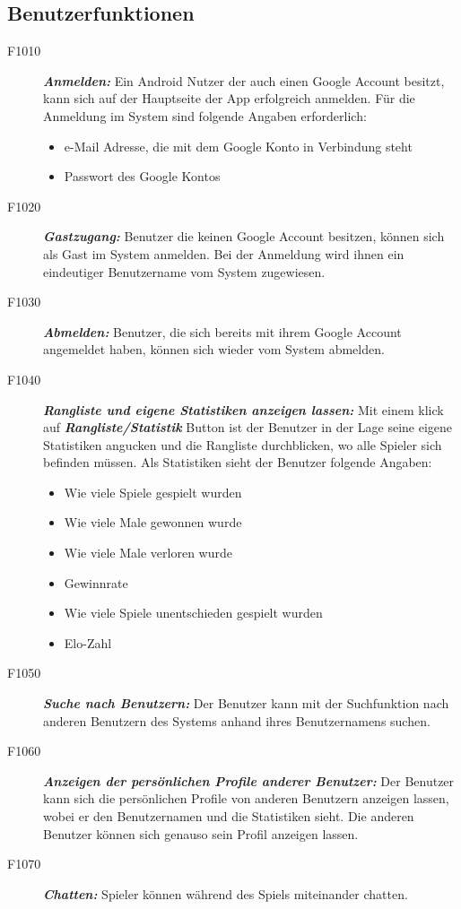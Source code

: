 \documentclass[parskip=full]{scrartcl}
\begin{document}
\subsection{Benutzerfunktionen}
\begin{description}
	\item[F1010] \textbf{\textit{Anmelden: }} Ein Android Nutzer der auch einen Google Account besitzt, kann sich auf der Hauptseite der App erfolgreich anmelden. Für die Anmeldung im System sind folgende Angaben erforderlich:
	\begin{itemize}
		\item e-Mail Adresse, die mit dem Google Konto in Verbindung steht
		\item Passwort des Google Kontos
	\end{itemize}  
	\item[F1020] \textbf{\textit{Gastzugang: }} Benutzer die keinen Google Account besitzen, können sich als Gast im System anmelden. Bei der Anmeldung wird ihnen ein eindeutiger Benutzername vom System zugewiesen. 
	\item[F1030] \textbf{\textit{Abmelden: }} Benutzer, die sich bereits mit ihrem Google Account angemeldet haben, können sich wieder vom System abmelden.
	
	
	\item [F1040] \textbf{\textit{Rangliste und eigene Statistiken anzeigen lassen: }} Mit einem klick auf \textbf{\textit{Rangliste/Statistik }} Button ist der Benutzer in der Lage seine eigene Statistiken angucken und die Rangliste durchblicken, wo alle Spieler sich befinden müssen. Als Statistiken sieht der Benutzer folgende Angaben:
	
	\begin{itemize}
		\item Wie viele Spiele gespielt wurden
		\item Wie viele Male gewonnen wurde
		\item Wie viele Male verloren wurde
		\item Gewinnrate
		\item Wie viele Spiele unentschieden gespielt wurden
		\item Elo-Zahl
		
	\end{itemize}
	\item[F1050] \textbf{\textit{Suche nach Benutzern: }} Der Benutzer kann mit der Suchfunktion nach anderen Benutzern des Systems anhand ihres Benutzernamens suchen.
	
	\item[F1060]  \textbf{\textit{Anzeigen der persönlichen Profile anderer Benutzer: }}
	Der Benutzer kann sich die persönlichen Profile von anderen Benutzern anzeigen lassen, wobei er den Benutzernamen und die Statistiken sieht. Die anderen Benutzer können sich genauso sein Profil anzeigen lassen.
	\item[F1070] \textbf{\textit{Chatten: }} Spieler können während des Spiels miteinander chatten.	
	
\end{description}
\end{document}

